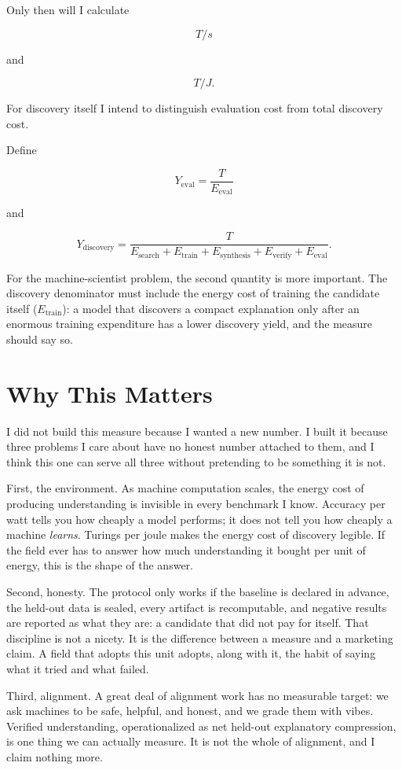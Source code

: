 \documentclass[11pt]{article}
\begin{document}
Only then will I calculate

\[
T/s
\]

and

\[
T/J.
\]

For discovery itself I intend to distinguish evaluation cost from total discovery cost.

Define

\[
Y_{\mathrm{eval}}
=
\frac{T}{E_{\mathrm{eval}}}
\]

and

\[
\boxed{
Y_{\mathrm{discovery}}
=
\frac{T}
{
E_{\mathrm{search}}
+
E_{\mathrm{train}}
+
E_{\mathrm{synthesis}}
+
E_{\mathrm{verify}}
+
E_{\mathrm{eval}}
}.
}
\]

For the machine-scientist problem, the second quantity is more important. The discovery denominator must include the energy cost of training the candidate itself (\(E_{\mathrm{train}}\)): a model that discovers a compact explanation only after an enormous training expenditure has a lower discovery yield, and the measure should say so.

\section{Why This Matters}

I did not build this measure because I wanted a new number. I built it because three problems I care about have no honest number attached to them, and I think this one can serve all three without pretending to be something it is not.

First, the environment. As machine computation scales, the energy cost of producing understanding is invisible in every benchmark I know. Accuracy per watt tells you how cheaply a model performs; it does not tell you how cheaply a machine \textit{learns}. Turings per joule makes the energy cost of discovery legible. If the field ever has to answer how much understanding it bought per unit of energy, this is the shape of the answer.

Second, honesty. The protocol only works if the baseline is declared in advance, the held-out data is sealed, every artifact is recomputable, and negative results are reported as what they are: a candidate that did not pay for itself. That discipline is not a nicety. It is the difference between a measure and a marketing claim. A field that adopts this unit adopts, along with it, the habit of saying what it tried and what failed.

Third, alignment. A great deal of alignment work has no measurable target: we ask machines to be safe, helpful, and honest, and we grade them with vibes. Verified understanding, operationalized as net held-out explanatory compression, is one thing we can actually measure. It is not the whole of alignment, and I claim nothing more.
\end{document}
